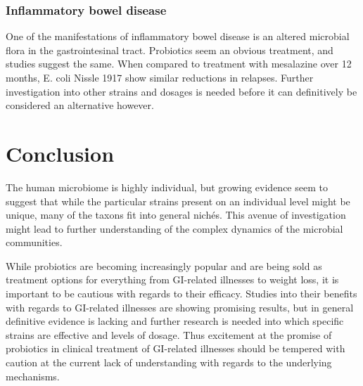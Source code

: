 \documentclass[12pt]{article}
\begin{document}
\subsubsection{Inflammatory bowel disease}
One of the manifestations of inflammatory bowel disease is an altered microbial flora in the gastrointesinal tract. Probiotics seem an obvious treatment, and studies suggest the same. When compared to treatment with mesalazine over 12 months, E. coli Nissle 1917 show similar reductions in relapses\cite{Islam2016}. Further investigation into other strains and dosages is needed before it can definitively be considered an alternative however. 

\section{Conclusion}
The human microbiome is highly individual, but growing evidence seem to suggest that while the particular strains present on an individual level might be unique, many of the taxons fit into general nichés. This avenue of investigation might lead to further understanding of the complex dynamics of the microbial communities. 

While probiotics are becoming increasingly popular and are being sold as treatment options for everything from GI-related illnesses to weight loss, it is important to be cautious with regards to their efficacy. Studies into their benefits with regards to GI-related illnesses are showing promising results, but in general definitive evidence is lacking and further research is needed into which specific strains are effective and levels of dosage. Thus excitement at the promise of probiotics in clinical treatment of GI-related illnesses should be tempered with caution at the current lack of understanding with regards to the underlying mechanisms. 



\newpage
{}

\end{document}
